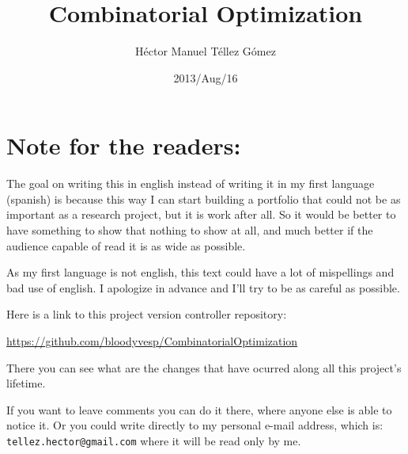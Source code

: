 ﻿\documentclass[oneside]{book}
\numberwithin{chapter}{part}
\numberwithin{section}{chapter}
\numberwithin{subsection}{section}
\numberwithin{subsubsection}{subsection}
\numberwithin{paragraph}{subsubsection}
\numberwithin{subparagraph}{paragraph}
\numberwithin{equation}{subparagraph}
\numberwithin{equation}{paragraph}
\numberwithin{equation}{subsubsection}
\numberwithin{equation}{subsection}
\numberwithin{equation}{section}
\numberwithin{equation}{chapter}
\numberwithin{equation}{part}
\begin{document}
		\frontmatter
		\title{Combinatorial Optimization}
		\author{Héctor Manuel Téllez Gómez}
		\date{2013/Aug/16}
		\maketitle

		\tableofcontents

		\mainmatter
		\chapter*{Note for the readers:}
			The goal on writing this in english instead of writing it in my first language (spanish) is because 
			this way I can start building a portfolio that could not be as important as a research project, but
			it is work after all. So it would be better to have something to show that nothing to show at all, 
			and much better if the audience capable of read it is as wide as possible.\pn
			
			As my first language is not english, this text could have a lot of mispellings and
			bad use of english. I apologize in advance and I'll try to be as careful as possible.\pn
			
			Here is a link to this project version controller repository:\par
			\href{https://github.com/bloodyvesp/CombinatorialOptimization}{https://github.com/bloodyvesp/CombinatorialOptimization}\par
			There you can see what are the changes that have ocurred along all this project's lifetime.\pn
			
			If you want to leave comments you can do it there, where anyone else is able to notice it. Or you could 
			write directly to my personal e-mail address, which is: \texttt{tellez.hector@gmail.com} where it will be read only
			by me.
    
\end{document}
